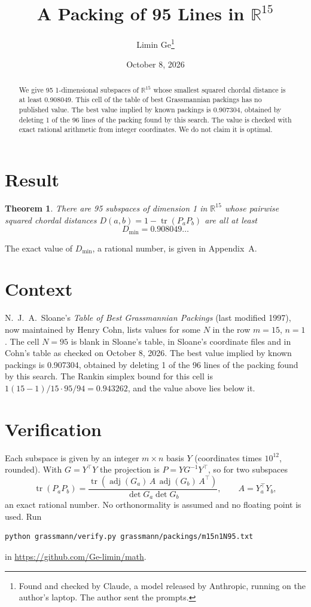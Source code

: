 \documentclass[11pt,a4paper]{article}
\title{A Packing of 95 Lines in $\mathbb{R}^{15}$}
\author{Limin Ge\thanks{Found and checked by Claude, a model released by Anthropic, running on the author's laptop. The author sent the prompts.}}
\date{October 8, 2026}
\newtheorem*{theorem}{Theorem}
\begin{document}
\maketitle
\begin{abstract}
We give 95 1-dimensional subspaces of $\mathbb{R}^{15}$ whose smallest squared chordal distance is at least 0.908049. This cell of the table of best Grassmannian packings has no published value. The best value implied by known packings is 0.907304, obtained by deleting 1 of the 96 lines of the packing found by this search. The value is checked with exact rational arithmetic from integer coordinates. We do not claim it is optimal.
\end{abstract}

\section{Result}
\begin{theorem}
There are 95 subspaces of dimension 1 in $\mathbb{R}^{15}$ whose pairwise squared chordal distances $D(a,b) = 1 - \operatorname{tr}(P_aP_b)$ are all at least
\[ D_{\min} = 0.908049\ldots \]
\end{theorem}
The exact value of $D_{\min}$, a rational number, is given in Appendix~A.


\section{Context}
N.~J.~A.~Sloane's \emph{Table of Best Grassmannian Packings} (last modified 1997), now maintained by Henry Cohn, lists values for some $N$ in the row $m=15$, $n=1$. The cell $N=95$ is blank in Sloane's table, in Sloane's coordinate files and in Cohn's table as checked on October 8, 2026. The best value implied by known packings is 0.907304, obtained by deleting 1 of the 96 lines of the packing found by this search. The Rankin simplex bound for this cell is $1(15-1)/15\cdot 95/94 = 0.943262$, and the value above lies below it.


\section{Verification}
Each subspace is given by an integer $m\times n$ basis $Y$ (coordinates times $10^{12}$, rounded). With $G=Y^\top Y$ the projection is $P=YG^{-1}Y^\top$, so for two subspaces
\[ \operatorname{tr}(P_aP_b)=\frac{\operatorname{tr}(\operatorname{adj}(G_a)\,A\,\operatorname{adj}(G_b)\,A^\top)}{\det G_a\det G_b},\qquad A=Y_a^\top Y_b, \]
an exact rational number. No orthonormality is assumed and no floating point is used. Run
\begin{verbatim}
python grassmann/verify.py grassmann/packings/m15n1N95.txt
\end{verbatim}
in \url{https://github.com/Ge-limin/math}.
\end{document}
